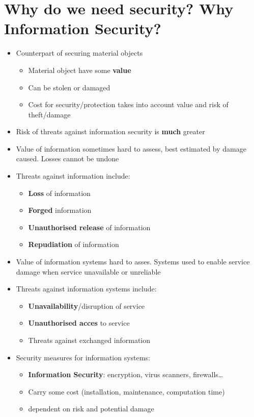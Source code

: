 \documentclass[11pt, faculty=ea]{ugent2016-report}
\begin{document}
\section{Why do we need security? Why Information Security?} \label{sec:why-do-we-need-security}
    \begin{itemize}
        \item Counterpart of securing material objects
            \begin{itemize}
                \item Material object have some \textbf{value}
                \item Can be stolen or damaged
                \item Cost for security/protection takes into account value and risk of theft/damage
            \end{itemize}
        \item Risk of threats against information security is \textbf{much} greater
        \item Value of information sometimes hard to assess, best estimated by damage caused. Losses cannot be undone
        \item Threats against information include:
            \begin{itemize}
                \item \textbf{Loss} of information
                \item \textbf{Forged} information
                \item \textbf{Unauthorised release} of information
                \item \textbf{Repudiation} of information
            \end{itemize}
        \item Value of information systems hard to asses. Systems used to enable service \rightarrow damage when service unavailable or unreliable
        \item Threats against information systems include:
            \begin{itemize}
                \item \textbf{Unavailability}/disruption of service
                \item \textbf{Unauthorised acces} to service
                \item Threats against exchanged information
            \end{itemize}
        \item Security measures for information systems:
        \begin{itemize}
            \item \textbf{Information Security}: encryption, virus scanners, firewalls\dots
            \item Carry some cost (installation, maintenance, computation time)
            \item dependent on risk and potential damage
        \end{itemize}
    \end{itemize}

\printbibliography
\end{document}
